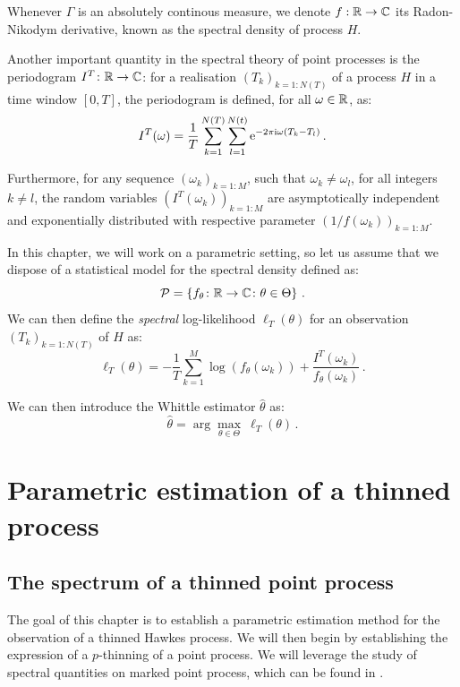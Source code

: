 Whenever $\Gamma$ is an absolutely continous measure, we denote $f:{\mathbb R}\to {\mathbb C}$ its Radon-Nikodym derivative, 
known as the spectral density of process $H$.

Another important quantity in the spectral theory of point processes is the periodogram $I^T\colon {\mathbb R} \to {\mathbb C}$:
for a realisation $(T_k)_{k=1:N(T)}$ of a process $H$ in a time window $[0,T]$, the periodogram is defined, for all $\omega\in{\mathbb R}$, as:
\[I^T(\omega) = \frac{1}{T}\sum_{k=1}^{N(T)}\sum_{l=1}^{N(t)}{\mathrm{e}^{-2\pi \mathrm{i} \omega (T_k - T_l)}}\,.\]

Furthermore, for any sequence $(\omega_k)_{k=1:M}$, such that $\omega_k \neq \omega_l$, for all integers $k\neq l$,
the random variables $(I^T(\omega_k))_{k=1:M}$ are asymptotically independent and exponentially distributed \parencite{Tuan1981} with respective parameter $(1/f(\omega_k))_{k=1:M}$.

In this chapter, we will work on a parametric setting, 
so let us assume that we dispose of a statistical model for the spectral density defined as:
\[
    \mathcal{P} = \left\{
        f_\theta \colon {\mathbb R} \to {\mathbb C} \colon \theta \in \Theta
    \right\}\,.
\]
We can then define the \textit{spectral} log-likelihood $\ell_T(\theta)$ for an observation $(T_k)_{k=1:N(T)}$ of $H$ as:
\begin{equation}\label{eq:chap5_spectral_ll}
    \ell_T(\theta) = -\frac{1}{T}\sum_{k=1}^{M}{\log(f_\theta (\omega_k)) + \frac{I^T(\omega_k)}{f_\theta(\omega_k)}}\,.
\end{equation}

We can then introduce the Whittle estimator $\hat \theta$ \parencite{Whittle1952} as:
\[\hat \theta = \arg\max_{\theta \in \Theta}~ \ell_T (\theta)\,.\]

\section{Parametric estimation of a thinned process}\label{sec:chap5_estimation}

\subsection{The spectrum of a thinned point process}

The goal of this chapter is to establish a parametric estimation method for the observation of a thinned Hawkes process.
We will then begin by establishing the expression of a $p$-thinning of a point process. 
We will leverage the study of spectral quantities on marked point process, 
which can be found in \textcite{Bremaud2002, Bremaud2005}. 

